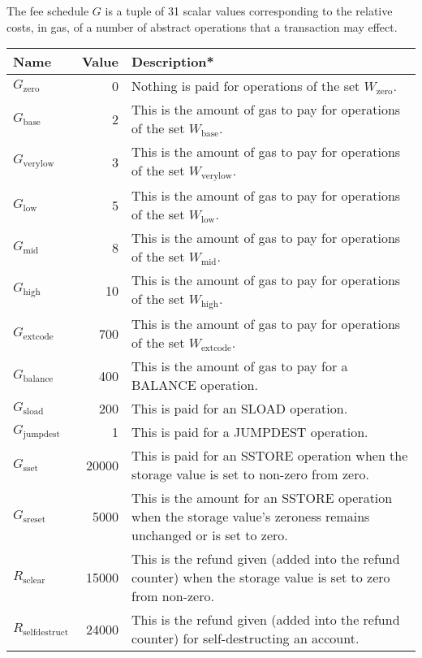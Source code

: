 \documentclass[9pt,oneside]{amsart}
\begin{document}
The fee schedule $G$ is a tuple of 31 scalar values corresponding to the relative costs, in gas, of a number of abstract operations that a transaction may effect.

\begin{tabularx}{\textwidth}{lrX}
\toprule
Name & Value & Description* \\
\midrule
$G_{\mathrm{zero}}$ & 0 & Nothing is paid for operations of the set {\small $W_{\mathrm{zero}}$}. \\
$G_{\mathrm{base}}$ & 2 & This is the amount of gas to pay for operations of the set {\small $W_{\mathrm{base}}$}. \\
$G_{\mathrm{verylow}}$ & 3 & This is the amount of gas to pay for operations of the set {\small $W_{\mathrm{verylow}}$}. \\
$G_{\mathrm{low}}$ & 5 & This is the amount of gas to pay for operations of the set {\small $W_{\mathrm{low}}$}. \\
$G_{\mathrm{mid}}$ & 8 & This is the amount of gas to pay for operations of the set {\small $W_{\mathrm{mid}}$}. \\
$G_{\mathrm{\mathrm{high}}}$ & 10 & This is the amount of gas to pay for operations of the set {\small $W_{\mathrm{\mathrm{high}}}$}. \\
$G_{\mathrm{extcode}}$ & 700 & This is the amount of gas to pay for operations of the set {\small $W_{\mathrm{extcode}}$}. \\
$G_{\mathrm{balance}}$ & 400 & This is the amount of gas to pay for a {\small BALANCE} operation. \\
$G_{\mathrm{sload}}$ & 200 & This is paid for an {\small SLOAD} operation. \\
$G_{\mathrm{jumpdest}}$ & 1 & This is paid for a {\small JUMPDEST} operation. \\
$G_{\mathrm{sset}}$ & 20000 & This is paid for an {\small SSTORE} operation when the storage value is set to non-zero from zero. \\
$G_{\mathrm{sreset}}$ & 5000 & This is the amount for an {\small SSTORE} operation when the storage value's zeroness remains unchanged or is set to zero. \\
$R_{\mathrm{sclear}}$ & 15000 & This is the refund given (added into the refund counter) when the storage value is set to zero from non-zero. \hypertarget{Rselfdestruct}{}\\
$R_{\mathrm{selfdestruct}}$ & 24000 & This is the refund given (added into the refund counter) for self-destructing an account. \hypertarget{Gselfdestruct}{}\\

\end{tabularx}
\end{document}

